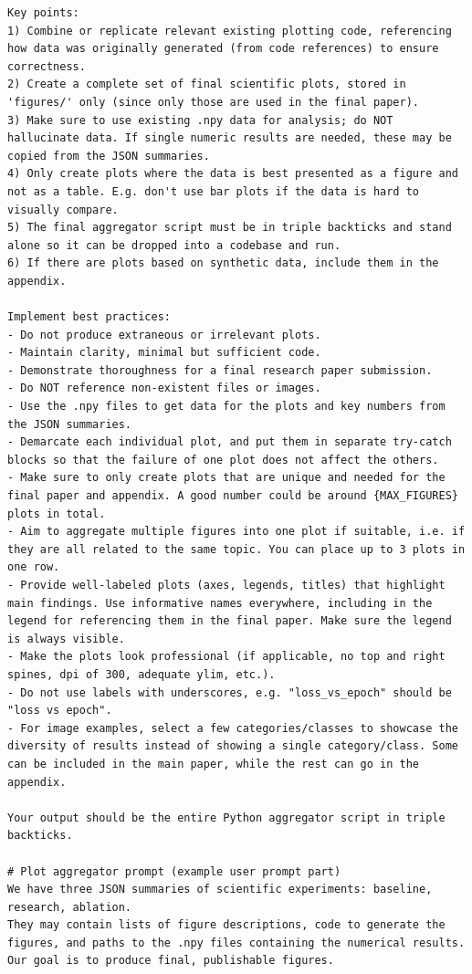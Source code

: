 \begin{appendices}
\begin{tcolorbox}[breakable, colback=orange!5!white, colframe=orange!80!black, title=Plot Aggregation Prompt]
\begin{Verbatim}[breaklines, breaksymbol={}, breaksymbolleft={}, fontsize=\small]
Key points:
1) Combine or replicate relevant existing plotting code, referencing how data was originally generated (from code references) to ensure correctness.
2) Create a complete set of final scientific plots, stored in 'figures/' only (since only those are used in the final paper).
3) Make sure to use existing .npy data for analysis; do NOT hallucinate data. If single numeric results are needed, these may be copied from the JSON summaries.
4) Only create plots where the data is best presented as a figure and not as a table. E.g. don't use bar plots if the data is hard to visually compare.
5) The final aggregator script must be in triple backticks and stand alone so it can be dropped into a codebase and run.
6) If there are plots based on synthetic data, include them in the appendix.

Implement best practices:
- Do not produce extraneous or irrelevant plots.
- Maintain clarity, minimal but sufficient code.
- Demonstrate thoroughness for a final research paper submission.
- Do NOT reference non-existent files or images.
- Use the .npy files to get data for the plots and key numbers from the JSON summaries.
- Demarcate each individual plot, and put them in separate try-catch blocks so that the failure of one plot does not affect the others.
- Make sure to only create plots that are unique and needed for the final paper and appendix. A good number could be around {MAX_FIGURES} plots in total.
- Aim to aggregate multiple figures into one plot if suitable, i.e. if they are all related to the same topic. You can place up to 3 plots in one row.
- Provide well-labeled plots (axes, legends, titles) that highlight main findings. Use informative names everywhere, including in the legend for referencing them in the final paper. Make sure the legend is always visible.
- Make the plots look professional (if applicable, no top and right spines, dpi of 300, adequate ylim, etc.).
- Do not use labels with underscores, e.g. "loss_vs_epoch" should be "loss vs epoch".
- For image examples, select a few categories/classes to showcase the diversity of results instead of showing a single category/class. Some can be included in the main paper, while the rest can go in the appendix.

Your output should be the entire Python aggregator script in triple backticks.

# Plot aggregator prompt (example user prompt part)
We have three JSON summaries of scientific experiments: baseline, research, ablation.
They may contain lists of figure descriptions, code to generate the figures, and paths to the .npy files containing the numerical results.
Our goal is to produce final, publishable figures.


\end{Verbatim}
\end{tcolorbox}
\end{appendices}

